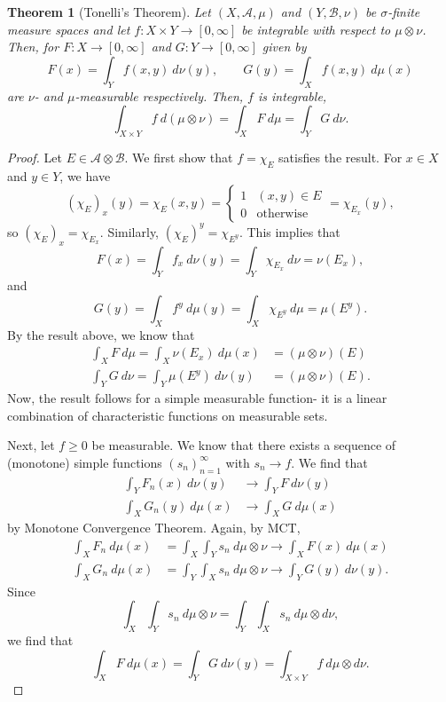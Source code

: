 \documentclass[a4paper, openany]{memoir}
\theoremstyle{definition}
\theoremstyle{plain}
\newtheorem{theorem}[definition]{Theorem}
\begin{document}
    \begin{theorem}[Tonelli's Theorem]
        Let $(X, \mathcal{A}, \mu)$ and $(Y, \mathcal{B}, \nu)$ be $\sigma$-finite measure spaces and let $f \colon X \times Y \to [0, \infty]$ be integrable with respect to $\mu \otimes \nu$. Then, for $F \colon X \to [0, \infty]$ and $G \colon Y \to [0, \infty]$ given by
        \[F(x) = \int_Y f(x, y) \ d\nu(y), \qquad G(y) = \int_X f(x, y) \ d\mu(x)\]
        are $\nu$- and $\mu$-measurable respectively. Then, $f$ is integrable,
        \[\int_{X \times Y} f \ d(\mu \otimes \nu) = \int_X F \ d\mu = \int_Y G \ d\nu.\]
    \end{theorem}
    \begin{proof}
        Let $E \in \mathcal{A} \otimes \mathcal{B}$. We first show that $f = \chi_E$ satisfies the result. For $x \in X$ and $y \in Y$, we have
        \[(\chi_E)_x(y) = \chi_E(x, y) = \begin{cases}
            1 & (x, y) \in E \\
            0 & \textrm{otherwise}
        \end{cases} = \chi_{E_x}(y),\]
        so $(\chi_E)_x = \chi_{E_x}$. Similarly, $(\chi_E)^y = \chi_{E^y}$. This implies that
        \[F(x) = \int_Y f_x \ d\nu(y) = \int_Y \chi_{E_x} \ d\nu = \nu(E_x),\]
        and
        \[G(y) = \int_X f^y \ d\mu(y) = \int_X \chi_{E^y} \ d\mu = \mu(E^y).\]
        By the result above, we know that
        \begin{align*}
            \int_X F \ d\mu = \int_X \nu(E_x) \ d\mu(x) &= (\mu \otimes \nu)(E) \\
            \int_Y G \ d\nu = \int_Y \mu(E^y) \ d\nu(y) &= (\mu \otimes \nu)(E).
        \end{align*}
        Now, the result follows for a simple measurable function- it is a linear combination of characteristic functions on measurable sets.

        Next, let $f \geq 0$ be measurable. We know that there exists a sequence of (monotone) simple functions $(s_n)_{n=1}^\infty$ with $s_n \to f$. We find that
        \begin{align*}
            \int_Y F_n(x) \ d\nu(y) &\to \int_Y F \ d\nu(y) \\
            \int_X G_n(y) \ d\mu(x) &\to \int_X G \ d\mu(x)
        \end{align*}
        by Monotone Convergence Theorem. Again, by MCT,
        \begin{align*}
            \int_X F_n \ d\mu(x) &= \int_X \int_Y s_n \ d\mu \otimes \nu \to \int_X F(x) \ d\mu(x) \\
            \int_X G_n \ d\mu(x) &= \int_Y \int_X s_n \ d\mu \otimes \nu \to \int_Y G(y) \ d\nu(y).
        \end{align*}
        Since
        \[\int_X \int_Y s_n \ d\mu \otimes \nu = \int_Y \int_X s_n \ d\mu \otimes d\nu,\]
        we find that
        \[\int_X F \ d\mu(x) = \int_Y G \ d\nu(y) = \int_{X \times Y} f \ d\mu \otimes d\nu.\]
    \end{proof}
\end{document}
